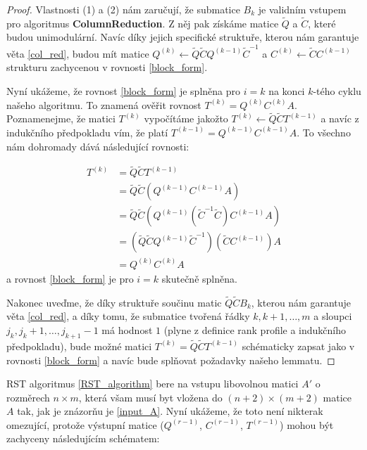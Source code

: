 \begin{proof}
Vlastnosti (1) a (2) nám zaručují, že submatice $ B_k $ je validním vstupem pro
algoritmus \textbf{ColumnReduction}. Z něj pak získáme matice $ \tilde{Q} $ a
$ \tilde{C} $, které budou unimodulární. Navíc díky jejich specifické struktuře,
kterou nám garantuje věta \ref{col_red}, budou mít matice
$ { Q^{(k)} \leftarrow \tilde{Q} \tilde{C} Q^{(k - 1)} \tilde{C}^{-1} } $ a
$ { C^{(k)} \leftarrow \tilde{C} C^{(k - 1)} } $
strukturu zachycenou v rovnosti \ref{block_form}.

Nyní ukážeme, že rovnost \ref{block_form} je splněna pro $ i = k $
na konci $ k $-tého cyklu našeho algoritmu. To znamená ověřit rovnost
$ T^{(k)} = Q^{(k)} C^{(k)} A $. Poznamenejme, že matici $ T^{(k)} $ vypočítáme
jakožto $ T^{(k)} \leftarrow \tilde{Q} \tilde{C} T^{(k - 1)} $ a navíc
z indukčního předpokladu vím, že platí $ T^{(k - 1)} = Q^{(k - 1)} C^{(k - 1)} A $.
To všechno nám dohromady dává následující rovnosti:

\begin{align*}
    T^{(k)} &= \tilde{Q} \tilde{C} T^{(k - 1)} \\
            &= \tilde{Q} \tilde{C} (Q^{(k - 1)} C^{(k - 1)} A) \\
            &= \tilde{Q} \tilde{C} (Q^{(k - 1)} (\tilde{C}^{-1} \tilde{C}) C^{(k - 1)} A) \\
            &= (\tilde{Q} \tilde{C} Q^{(k - 1)} \tilde{C}^{-1}) (\tilde{C} C^{(k - 1)}) A \\
            &= Q^{(k)} C^{(k)} A
\end{align*}
a rovnost \ref{block_form} je pro $ i = k $ skutečně splněna.

Nakonec uveďme, že díky struktuře součinu matic $ \tilde{Q} \tilde{C} B_k $, kterou
nám garantuje věta \ref{col_red}, a díky tomu, že submatice tvořená řádky
$ k, k+1, \dots, m $ a sloupci $ j_k, j_k + 1, \dots, j_{k+1} - 1 $ má hodnost
$ 1 $ (plyne z definice rank profile a indukčního předpokladu), bude možné matici
$ T^{(k)} = \tilde{Q} \tilde{C} T^{(k - 1)} $ schématicky zapsat jako v rovnosti
\ref{block_form} a navíc bude splňovat požadavky našeho lemmatu.
\end{proof}

RST algoritmus \ref{RST_algorithm} bere na vstupu libovolnou matici $ A' $ o
rozměrech $ n \times m $, která všam musí byt vložena do $ (n + 2) \times (m + 2) $
matice $ A $ tak, jak je znázorňu je \ref{input_A}. Nyní ukážeme, že toto není
nikterak omezující, protože výstupní matice
($ Q^{(r - 1)} $, $ C^{(r - 1)} $, $ T^{(r - 1)} $) mohou být zachyceny
následujícím schématem:

